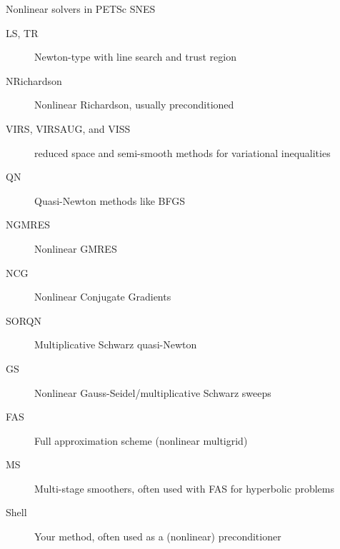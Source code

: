 \begin{frame}{Nonlinear solvers in PETSc SNES}
  \begin{description}
  \item[LS, TR] Newton-type with line search and trust region
  \item[NRichardson] Nonlinear Richardson, usually preconditioned
  \item[VIRS, VIRSAUG, and VISS] reduced space and semi-smooth methods for variational inequalities
  \item[QN] Quasi-Newton methods like BFGS
  \item[NGMRES] Nonlinear GMRES
  \item[NCG] Nonlinear Conjugate Gradients
  \item[SORQN] Multiplicative Schwarz quasi-Newton
  \item[GS] Nonlinear Gauss-Seidel/multiplicative Schwarz sweeps
  \item[FAS] Full approximation scheme (nonlinear multigrid)
  \item[MS] Multi-stage smoothers, often used with FAS for hyperbolic problems
  \item[Shell] Your method, often used as a (nonlinear) preconditioner
  \end{description}
\end{frame}
